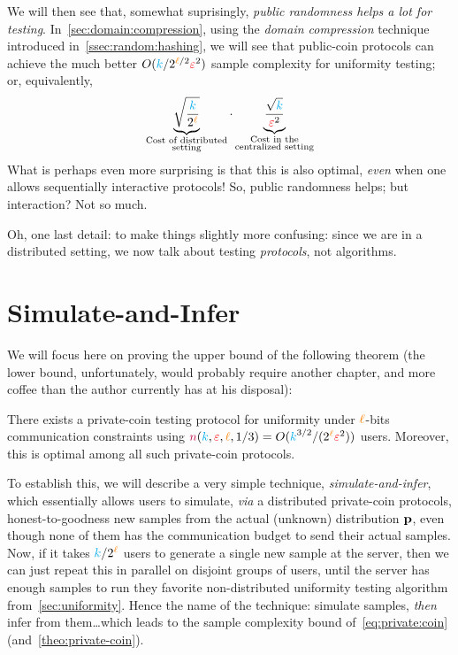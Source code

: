 We will then see that, somewhat suprisingly, \emph{public randomness helps a lot for testing}. In~\cref{sec:domain:compression}, using the \emph{domain compression} technique introduced in~\cref{ssec:random:hashing}, we will see that public-coin protocols can achieve the much better $O({\textcolor{cyan}{k}}/2^{{\textcolor{orange}{\ell}}/2}\textcolor{red}{\varepsilon}^2)$ sample complexity for uniformity testing; or, equivalently,
\begin{equation}
		\underbrace{\sqrt{\frac{{\textcolor{cyan}{k}}}{2^{\textcolor{orange}{\ell}}}}}_{\substack{\text{Cost of distributed}\\\text{setting}}}\cdot \underbrace{\frac{\sqrt{{\textcolor{cyan}{k}}}}{\textcolor{red}{\varepsilon}^2}}_{\substack{\text{Cost in the}\\\text{centralized setting}}}
\end{equation}
What is perhaps even more surprising is that this is also optimal, \emph{even} when one allows sequentially interactive protocols! So, public randomness helps; but interaction? Not so much.


Oh, one last detail: to make things slightly more confusing: since we are in a distributed setting, we now talk about testing \emph{protocols}, not algorithms.

\section{Simulate-and-Infer}
  \label{sec:simulate:infer}
 We will focus here on proving the upper bound of the following theorem (the lower bound, unfortunately, would probably require another chapter, and more coffee than the author currently has at his disposal):
\begin{theorem}
  \label{theo:private-coin}
There exists a private-coin testing protocol for uniformity under ${\textcolor{orange}{\ell}}$-bits communication constraints using ${\textcolor{purple}{n}}({\textcolor{cyan}{k}},\textcolor{red}{\varepsilon},{\textcolor{orange}{\ell}}, 1/3) = O({\textcolor{cyan}{k}}^{3/2}/(2^{\textcolor{orange}{\ell}} \textcolor{red}{\varepsilon}^2))$ users. Moreover, this is optimal among all such private-coin protocols.
\end{theorem}
To establish this, we will describe a very simple technique, \emph{simulate-and-infer}, which essentially allows users to simulate, \emph{via} a distributed private-coin protocols, honest-to-goodness new \iid samples from the actual (unknown) distribution $\mathbf{p}$, even though none of them has the communication budget to send their actual samples. Now, if it takes ${\textcolor{cyan}{k}}/2^{\textcolor{orange}{\ell}}$ users to generate a single new sample at the server, then we can just repeat this in parallel on disjoint groups of users, until the server has enough samples to run they favorite non-distributed uniformity testing algorithm from~\cref{sec:uniformity}. Hence the name of the technique: simulate samples, \emph{then} infer from them\dots which leads to the sample complexity bound of~\cref{eq:private:coin} (and~\cref{theo:private-coin}).\smallskip

